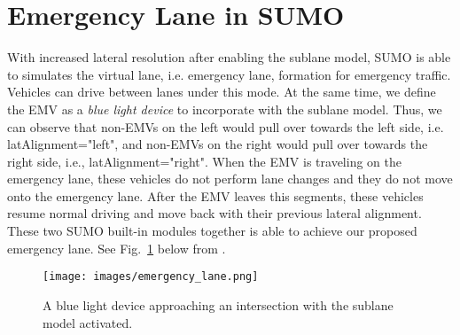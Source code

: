 \section{Emergency Lane in SUMO}\label{appendix_c}
With increased lateral resolution after enabling the sublane model, SUMO is able to simulates the virtual lane, i.e. emergency lane, formation for emergency traffic. Vehicles can drive between lanes under this mode. At the same time, we define the EMV as a \emph{blue light device} to incorporate with the sublane model. Thus, we can observe that non-EMVs on the left would pull over towards the left side, i.e. latAlignment="left", and non-EMVs on the right would pull over towards the right side, i.e.,  latAlignment="right". When the EMV is traveling on the emergency lane, these vehicles do not perform lane changes and they do not move onto the emergency lane. After the EMV leaves this segments, these vehicles resume normal driving and move back with their previous lateral alignment. These two SUMO built-in modules together is able to achieve our proposed emergency lane. See Fig.~\ref{fig_emergency_lane_SUMO} below from \cite{bieker2018analysis}.
\begin{figure}[ht]
\texttt{[image: images/emergency\_lane.png]}
\centering
\caption{A blue light device approaching an intersection with the sublane model activated. }
\label{fig_emergency_lane_SUMO}
\end{figure}

